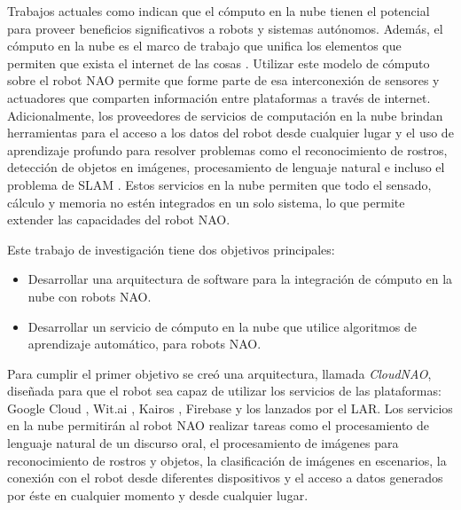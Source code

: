 
Trabajos actuales como 
\cite{benkehoesachinpatilpieterabbeelkengoldberg2014}
indican que el cómputo en la nube tienen el potencial para
proveer beneficios significativos a robots y
sistemas autónomos.
Además, el cómputo en la nube es el marco de trabajo que
unifica los elementos que permiten que exista el
internet de las cosas \cite{jayavardhanagubbiarajkumarbuyyabslavenmarusicamarimuthupalaniswamia2013}. Utilizar este modelo de cómputo sobre el robot NAO permite
que forme parte de esa interconexión de sensores y actuadores que comparten información entre plataformas
a través de internet. Adicionalmente, los proveedores de servicios de 
computación en la nube brindan herramientas para el acceso 
a los datos del robot desde cualquier lugar y el uso de 
aprendizaje profundo para resolver problemas 
como el reconocimiento de rostros, detección de objetos en
imágenes, procesamiento de lenguaje natural e incluso el 
problema de SLAM \cite{tateno2017cnn}.
Estos servicios en la nube permiten que
todo el sensado, cálculo y memoria no estén
integrados en un solo sistema, lo que permite
extender las capacidades del robot NAO.

Este trabajo de investigación tiene dos objetivos principales:

\begin{itemize}
    \item Desarrollar una arquitectura de software para la
integración de cómputo en la nube con robots NAO.
    \item Desarrollar un servicio de cómputo en la nube que
utilice algoritmos de aprendizaje automático, para robots NAO.
\end{itemize}

Para cumplir el primer objetivo se creó una arquitectura, llamada \textit{CloudNAO}, diseñada para que el robot sea capaz de utilizar los servicios
de las plataformas: Google Cloud \cite{googlevision2018}, Wit.ai \cite{witaidocs2018}, Kairos \cite{kairosdevdocs2018}, Firebase \cite{firebasedocs2018}
y los lanzados por el LAR.
Los servicios en la nube permitirán al robot NAO
realizar tareas como el procesamiento de lenguaje
natural de un discurso oral, el procesamiento 
de imágenes para reconocimiento de rostros
y objetos, la clasificación de
imágenes en escenarios, la conexión con el robot desde diferentes dispositivos y el acceso a datos generados por
éste en cualquier momento y desde cualquier lugar.

